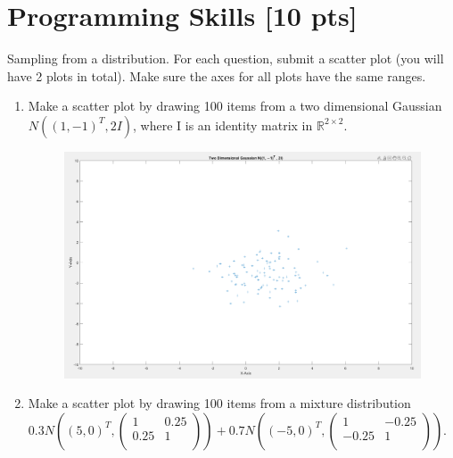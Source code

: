 \documentclass[a4paper]{article}
\theoremstyle{definition}
\newenvironment{soln}{
	\leavevmode\color{blue}\ignorespaces
}{}
\begin{document}
	\section{Programming Skills [10 pts]}
	Sampling from a distribution.  For each question, submit a scatter plot (you will have 2 plots in total).  Make sure the axes for all plots have the same ranges.
	\begin{enumerate}
		\item Make a scatter plot by drawing 100 items from a two dimensional Gaussian $N((1, -1)^{T}, 2I)$, where I is an identity matrix in $\mathbb{R}^{2 \times 2}$.
		
			\begin{soln}
			\begin{figure}[h!]
			    \centering
			    \includegraphics[width=1\textwidth]{images/7_1.png}  
			    \captionsetup{labelformat=empty}
			    \caption{}
			    \label{fig:2-D Gaussian}
			\end{figure}
		\end{soln}

        \newpage
        
		\item Make a scatter plot by drawing 100 items from a mixture distribution 
		$0.3 N\left((5, 0)^{T}, \begin{pmatrix} 1 & 0.25 \\ 0.25 & 1\\ \end{pmatrix}\right)
		+0.7 N\left((-5, 0)^{T}, \begin{pmatrix} 1 & -0.25 \\ -0.25 & 1\\ \end{pmatrix}\right)
		$.


\end{enumerate}
\end{document}
